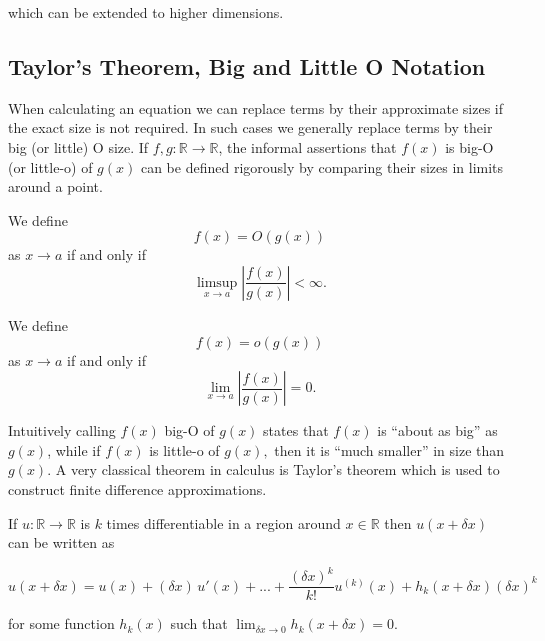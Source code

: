 \documentclass[../main.tex]{subfiles}
\begin{document}
  which can be extended to higher dimensions.

  \subsection{Taylor's Theorem, Big and Little O Notation}
  When calculating an equation we can replace terms by their approximate sizes if the exact size is not required. In such cases we generally replace terms by their big (or little) O size. If $f, g : \mathbb{R} \to \mathbb{R}$, the informal assertions that $f(x)$ is big-O (or little-o) of $g(x)$ can be defined rigorously by comparing their sizes in limits around a point.

  \begin{definition}[Big O]
    We define
    \begin{equation}
      f(x) = O(g(x))
    \end{equation}
    as $x \to a$ if and only if
    \begin{equation}
      \limsup_{x \to a} \left\vert \frac{f(x)}{g(x)} \right\vert < \infty.
    \end{equation}
  \end{definition}

  \begin{definition}[Little O]
    We define
    \begin{equation}
      f(x) = o(g(x))
    \end{equation}
    as $x \to a$ if and only if
    \begin{equation}
      \lim_{x \to a} \left\vert \frac{f(x)}{g(x)} \right\vert = 0.
    \end{equation}
  \end{definition}

  Intuitively calling $f(x)$ big-O of $g(x)$ states that $f(x)$ is ``about as big'' as $g(x)$, while if $f(x)$ is little-o of $g(x),$ then it is ``much smaller'' in size than $g(x)$. A very classical theorem in calculus is Taylor's theorem which is used to construct finite difference approximations.

  \begin{theorem}[Taylor]
    If $u : \mathbb{R} \to \mathbb{R}$ is $k$ times differentiable in a region around $x \in \mathbb{R}$ then $u(x + \delta x)$ can be written as

    \begin{equation} \label{diff:eq:taylor}
      u(x + \delta x) = u(x) + (\delta x) \, u'(x) + ... + \frac{(\delta x)^k}{k!} u^{(k)}(x) + h_k(x + \delta x) (\delta x)^k
    \end{equation}

    for some function $h_k(x)$ such that $\lim_{\delta x \to 0} h_k(x + \delta x) = 0$.
  \end{theorem}
\end{document}
